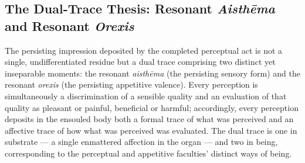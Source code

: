 \subsection{The Dual-Trace Thesis: Resonant \textit{Aisthēma} and Resonant \textit{Orexis}}

The persisting impression deposited by the completed perceptual act is not a single, undifferentiated residue but a dual trace comprising two distinct yet inseparable moments: the resonant \textit{aisthēma} (the persisting sensory form) and the resonant \textit{orexis} (the persisting appetitive valence). Every perception is simultaneously a discrimination of a sensible quality and an evaluation of that quality as pleasant or painful, beneficial or harmful; accordingly, every perception deposits in the ensouled body both a formal trace of what was perceived and an affective trace of how what was perceived was evaluated. The dual trace is one in substrate --- a single enmattered affection in the organ --- and two in being, corresponding to the perceptual and appetitive faculties' distinct ways of being.


